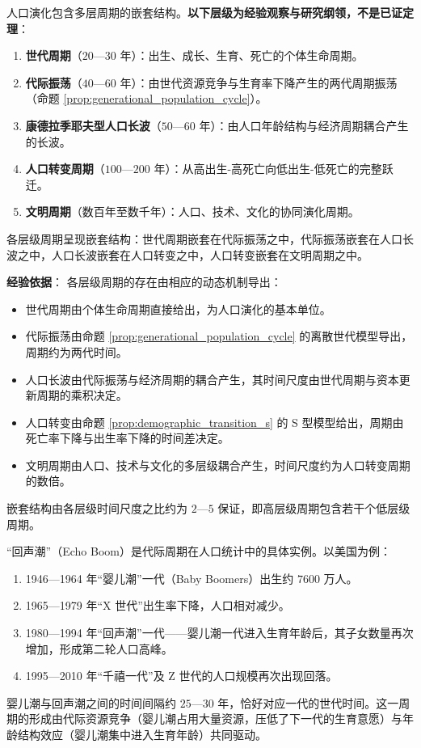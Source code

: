 \begin{remark}\label{thm:population_multi_cycle}
人口演化包含多层周期的嵌套结构。\textbf{以下层级为经验观察与研究纲领，不是已证定理}：
\begin{enumerate}[label=(\roman*)]
    \item \textbf{世代周期}（$20$—$30$ 年）：出生、成长、生育、死亡的个体生命周期。
    \item \textbf{代际振荡}（$40$—$60$ 年）：由世代资源竞争与生育率下降产生的两代周期振荡（命题 \ref{prop:generational_population_cycle}）。
    \item \textbf{康德拉季耶夫型人口长波}（$50$—$60$ 年）：由人口年龄结构与经济周期耦合产生的长波。
    \item \textbf{人口转变周期}（$100$—$200$ 年）：从高出生-高死亡向低出生-低死亡的完整跃迁。
    \item \textbf{文明周期}（数百年至数千年）：人口、技术、文化的协同演化周期。
\end{enumerate}
各层级周期呈现嵌套结构：世代周期嵌套在代际振荡之中，代际振荡嵌套在人口长波之中，人口长波嵌套在人口转变之中，人口转变嵌套在文明周期之中。

\textbf{经验依据}：
各层级周期的存在由相应的动态机制导出：
\begin{itemize}
    \item 世代周期由个体生命周期直接给出，为人口演化的基本单位。
    \item 代际振荡由命题 \ref{prop:generational_population_cycle} 的离散世代模型导出，周期约为两代时间。
    \item 人口长波由代际振荡与经济周期的耦合产生，其时间尺度由世代周期与资本更新周期的乘积决定。
    \item 人口转变由命题 \ref{prop:demographic_transition_s} 的 S 型模型给出，周期由死亡率下降与出生率下降的时间差决定。
    \item 文明周期由人口、技术与文化的多层级耦合产生，时间尺度约为人口转变周期的数倍。
\end{itemize}
嵌套结构由各层级时间尺度之比约为 $2$—$5$ 保证，即高层级周期包含若干个低层级周期。
\end{remark}

\begin{example}\label{ex:echo_boom}
“回声潮”（Echo Boom）是代际周期在人口统计中的具体实例。以美国为例：
\begin{enumerate}[label=(\roman*)]
    \item 1946—1964 年“婴儿潮”一代（Baby Boomers）出生约 $7600$ 万人。
    \item 1965—1979 年“X 世代”出生率下降，人口相对减少。
    \item 1980—1994 年“回声潮”一代——婴儿潮一代进入生育年龄后，其子女数量再次增加，形成第二轮人口高峰。
    \item 1995—2010 年“千禧一代”及 Z 世代的人口规模再次出现回落。
\end{enumerate}
婴儿潮与回声潮之间的时间间隔约 $25$—$30$ 年，恰好对应一代的世代时间。这一周期的形成由代际资源竞争（婴儿潮占用大量资源，压低了下一代的生育意愿）与年龄结构效应（婴儿潮集中进入生育年龄）共同驱动。
\end{example}

